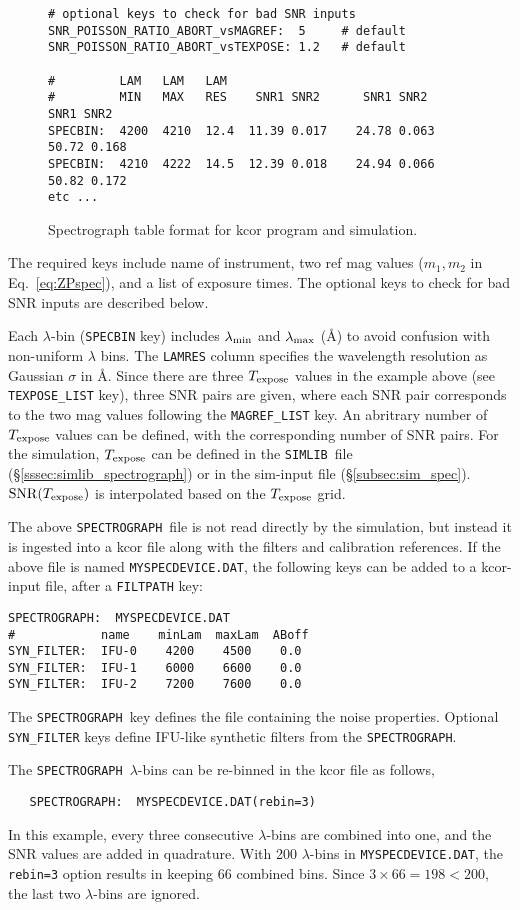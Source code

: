 \documentclass[12pt]{article}
\newcommand{\SPEC}{{\tt SPECTROGRAPH}}
\newcommand{\Texpose}{T_{\rm expose}}
\newcommand{\simlib}{{\tt SIMLIB}}
\newcommand{\lam}{\lambda}
\begin{document}
{\begin{figure} [ht]
\begin{center}
\begin{Verbatim}[frame=single]
# optional keys to check for bad SNR inputs
SNR_POISSON_RATIO_ABORT_vsMAGREF:  5     # default
SNR_POISSON_RATIO_ABORT_vsTEXPOSE: 1.2   # default

#         LAM   LAM   LAM
#         MIN   MAX   RES    SNR1 SNR2      SNR1 SNR2      SNR1 SNR2
SPECBIN:  4200  4210  12.4  11.39 0.017    24.78 0.063    50.72 0.168   
SPECBIN:  4210  4222  14.5  12.39 0.018    24.94 0.066    50.82 0.172   
etc ...
\end{Verbatim}
\end{center}
\caption{
  Spectrograph table format for kcor program and simulation.
 }
\label{fig:spectro_table}
\end{figure}
%
The required keys include name of instrument,
two ref mag values ($m_1,m_2$ in Eq.~\ref{eq:ZPspec}),
and a list of exposure times. The optional keys to 
check for bad SNR inputs are described below.

Each $\lam$-bin ({\tt SPECBIN} key) includes 
$\lam_{\rm min}$ and $\lam_{\rm max}$ (\AA)
to avoid confusion with non-uniform $\lam$ bins. 
The {\tt LAMRES} column specifies the wavelength resolution
as Gaussian $\sigma$ in \AA.
Since there are three $\Texpose$ values in the example above
(see {\tt TEXPOSE\_LIST} key),
three SNR pairs are given, where each SNR pair corresponds
to the two mag values following the {\tt MAGREF\_LIST} key.
An abritrary number of $\Texpose$ values can be defined,
with the corresponding number of SNR pairs.
For the simulation, $\Texpose$ can be defined in the
\simlib\ file (\S\ref{sssec:simlib_spectrograph})
or in the sim-input file (\S\ref{subsec:sim_spec}).
${\rm SNR}(\Texpose)$ is interpolated based on the $\Texpose$ grid.

The above \SPEC\ file is not read directly by the simulation,
but instead it is ingested into a kcor file along with the
filters and calibration references.
If the above file is named {\tt MYSPECDEVICE.DAT},
the following keys can be added to a kcor-input file,
after a {\tt FILTPATH} key:
%
\begin{Verbatim}[frame=single]
SPECTROGRAPH:  MYSPECDEVICE.DAT
#            name    minLam  maxLam  ABoff
SYN_FILTER:  IFU-0    4200    4500    0.0
SYN_FILTER:  IFU-1    6000    6600    0.0
SYN_FILTER:  IFU-2    7200    7600    0.0 
\end{Verbatim}
The \SPEC\ key defines the file containing the noise properties.
Optional {\tt SYN\_FILTER} keys define IFU-like synthetic
filters from the \SPEC. 

The \SPEC\ $\lam$-bins can be re-binned in the kcor file
as follows,
\begin{verbatim}
   SPECTROGRAPH:  MYSPECDEVICE.DAT(rebin=3)
\end{verbatim}
%
In this example, every three consecutive $\lam$-bins are combined
into one, and the SNR values are added in quadrature. 
With 200 $\lam$-bins in {\tt MYSPECDEVICE.DAT}, the {\tt rebin=3}
option results in keeping 66 combined bins. Since $3\times 66=198 < 200$,
the last two $\lam$-bins are ignored.

}
\end{document}
